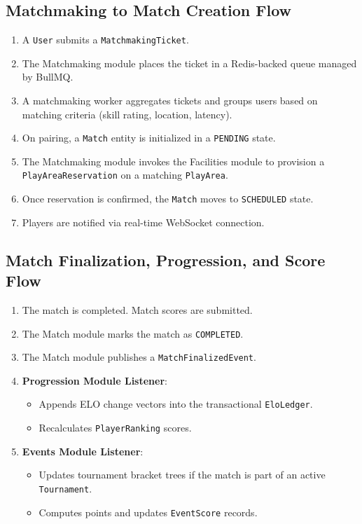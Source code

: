 \documentclass[11pt,a4paper]{report}
\begin{document}
\subsection{Matchmaking to Match Creation Flow}
\begin{enumerate}
    \item A \texttt{User} submits a \texttt{MatchmakingTicket}.
    \item The Matchmaking module places the ticket in a Redis-backed queue managed by BullMQ.
    \item A matchmaking worker aggregates tickets and groups users based on matching criteria (skill rating, location, latency).
    \item On pairing, a \texttt{Match} entity is initialized in a \texttt{PENDING} state.
    \item The Matchmaking module invokes the Facilities module to provision a \texttt{PlayAreaReservation} on a matching \texttt{PlayArea}.
    \item Once reservation is confirmed, the \texttt{Match} moves to \texttt{SCHEDULED} state.
    \item Players are notified via real-time WebSocket connection.
\end{enumerate}

\subsection{Match Finalization, Progression, and Score Flow}
\begin{enumerate}
    \item The match is completed. Match scores are submitted.
    \item The Match module marks the match as \texttt{COMPLETED}.
    \item The Match module publishes a \texttt{MatchFinalizedEvent}.
    \item \textbf{Progression Module Listener}:
        \begin{itemize}
            \item Appends ELO change vectors into the transactional \texttt{EloLedger}.
            \item Recalculates \texttt{PlayerRanking} scores.
        \end{itemize}
    \item \textbf{Events Module Listener}:
        \begin{itemize}
            \item Updates tournament bracket trees if the match is part of an active \texttt{Tournament}.
            \item Computes points and updates \texttt{EventScore} records.
        \end{itemize}
\end{enumerate}
\end{document}
